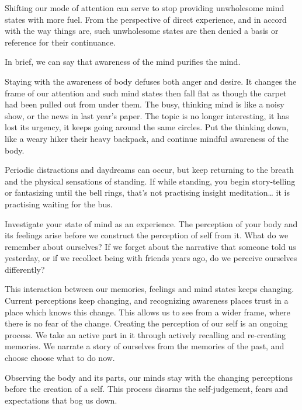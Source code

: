 \clearpage

Shifting our mode of attention can serve to stop providing unwholesome
mind states with more fuel. From the perspective of direct experience,
and in accord with the way things are, such unwholesome states are then
denied a basis or reference for their continuance.

In brief, we can say that awareness of the mind purifies the mind.

Staying with the awareness of body defuses both anger and desire. It
changes the frame of our attention and such mind states then fall flat
as though the carpet had been pulled out from under them. The busy,
thinking mind is like a noisy show, or the news in last year's paper.
The topic is no longer interesting, it has lost its urgency, it keeps
going around the same circles. Put the thinking down, like a weary hiker
their heavy backpack, and continue mindful awareness of the body.

Periodic distractions and daydreams can occur, but keep returning to the
breath and the physical sensations of standing. If while standing, you
begin story-telling or fantasizing until the bell rings, that's not
practising insight meditation\ldots{} it is practising waiting for the
bus.


\enlargethispage{\baselineskip}

Investigate your state of mind as an experience. The perception of your
body and its feelings arise before we construct the perception of self
from it. What do we remember about ourselves? If we forget about the
narrative that someone told us yesterday, or if we recollect being with
friends years ago, do we perceive ourselves differently?

This interaction between our memories, feelings and mind states keeps
changing. Current perceptions keep changing, and recognizing awareness
places trust in a place which knows this change. This allows us to see
from a wider frame, where there is no fear of the change. Creating the
perception of our self is an ongoing process. We take an active part in
it through actively recalling and re-creating memories. We narrate a
story of ourselves from the memories of the past, and choose choose what
to do now.


Observing the body and its parts, our minds stay with the changing
perceptions before the creation of a self. This process disarms the
self-judgement, fears and expectations that bog us down.

